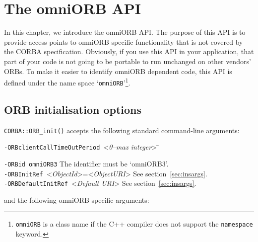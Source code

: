 \documentclass[11pt,twoside,a4paper]{book}
\newcommand{\code}[1]{\texttt{#1}}
\newcommand{\op}[1]{\texttt{#1()}}
\newcommand{\cmdline}[1]{\texttt{#1}}
\begin{document}
\chapter{The omniORB API}
\label{omniORBapi}

In this chapter, we introduce the omniORB API. The purpose of this API
is to provide access points to omniORB specific functionality that is
not covered by the CORBA specification.  Obviously, if you use this
API in your application, that part of your code is not going to be
portable to run unchanged on other vendors' ORBs. To make it easier to
identify omniORB dependent code, this API is defined under the name
space `\code{omniORB}'\footnote{\code{omniORB} is a class name if the
C++ compiler does not support the \code{namespace} keyword.}.

\section{ORB initialisation options}
\label{omniorbapioptions}

\op{CORBA::ORB\_init} accepts the following standard command-line
arguments:

\begin{tabbing}
\cmdline{-ORBclientCallTimeOutPeriod }<\textit{0--max integer}> \=\kill

\cmdline{-ORBid omniORB3} \> The identifier must be `omniORB3'.\\

\cmdline{-ORBInitRef }<\textit{ObjectId}>=<\textit{ObjectURI}>
                          \> See section~\ref{sec:insargs}.\\

\cmdline{-ORBDefaultInitRef }<\textit{Default URI}>
                          \> See section~\ref{sec:insargs}.
\end{tabbing}


\noindent and the following omniORB-specific arguments:
\end{document}

